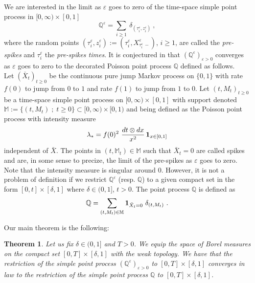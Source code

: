 \documentclass[reqno, 12pt, a4paper]{amsart}
\theoremstyle{plain}
\newtheorem{theorem}{Theorem}[section]
\theoremstyle{definition}
\begin{document}
\bigskip

We are interested in the limit as $\varepsilon$ goes to zero of the time-space simple point process in $[0,\infty) \times [0,1]$  
\begin{equation}\label{measure_1}
    \mathbb Q^\varepsilon = \sum_{i \ge 1} \ \delta_{(\tau_i^\varepsilon,z_i^\varepsilon)} \ ,
\end{equation}
where the random points $(\tau_i^{\varepsilon}, z_i^\varepsilon):=(\tau^\varepsilon_i, X^\varepsilon_{{\tau^\varepsilon_i} \, -} )$, $i \ge 1$, are called the {\textit{pre-spikes}} and $\tau_i^\varepsilon$ the {\textit{pre-spikes times}}. It is conjectured in \cite{SBDKC25} that $(\mathbb Q^\varepsilon)_{\varepsilon>0}$ converges as $\varepsilon$ goes to zero to the decorated Poisson point process $\mathbb Q$ defined as follows.\\


Let $({\bar X}_t)_{t \ge 0}$ be the continuous pure jump Markov process on $\{0,1\}$ with rate $f(0)$ to jump from $0$ to $1$ and rate $f(1)$ to jump from $1$ to $0$. Let $(t,M_t)_{t \ge 0}$ be a time-space simple point process on $[0,\infty) \times [0,1]$ with support denoted $\mathbb M:=\{(t, M_t) \; ; \; t\ge 0\} \subset \mathbb [0,\infty)\times [0,1)$ and being defined as the Poisson point process with intensity measure
\begin{equation}
\label{full_int_meas}
\lambda_* = f(0)^2  \  \frac{dt \otimes dx}{x^2} \,{\bf 1}_{x \in [0,1]} 
\end{equation}
independent of ${\bar X}$. The points in $(t, \mathbb M_t) \in \mathbb M$ such that $\bar X_t=0$  are called spikes and are, in some sense to precize, the limit of the pre-spikes as $\varepsilon$ goes to zero. Note that the intensity measure is singular around $0$. However, it is not a problem of definition  if we restrict $\mathbb Q^\varepsilon$ (resp. $\mathbb Q$) to a given compact set in the form $[0,t] \times[\delta, 1]$ where $\delta \in (0,1]$, $t>0$. The point process $\mathbb Q$ is defined as
\begin{equation}
\label{eq:mathbbQ}
\mathbb Q = \sum_{(t, M_t) \in \mathbb M}  {\bf 1}_{{\bar X}_t = 0}\  \delta_{(t, M_t)} \ .
\end{equation}
 

Our main theorem is the following:

\begin{theorem}
\label{thm:mainone}
Let us fix $\delta \in (0,1]$ and $T>0$. We equip the space of Borel measures on the compact set $[0,T] \times [\delta, 1]$ with the weak topology.  We have that the restriction of the simple point process $(\mathbb Q^\varepsilon)_{\varepsilon>0}$ to $[0,T] \times [\delta, 1]$ converges in law to the restriction of the simple point process $\mathbb Q$ to $[0,T] \times [\delta, 1]$.
\end{theorem}
\end{document}
